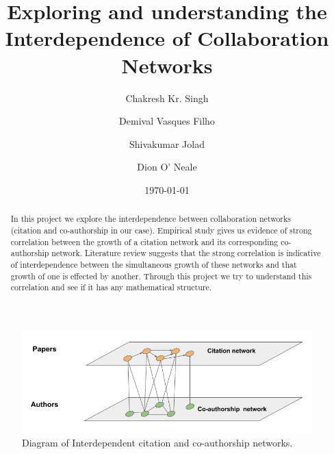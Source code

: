 \documentclass[aps, pre, twocolumn, nofootinbib]{revtex4-1}
\begin{document}

\title{Exploring and understanding the Interdependence of Collaboration Networks}

\author{Chakresh Kr. Singh}
\author{Demival Vasques Filho}
\author{Shivakumar Jolad}

\author{Dion O' Neale}


\date{\today}

\begin{abstract}
In this project we explore the interdependence between collaboration networks (citation and co-authorship in our case). Empirical study gives us evidence of strong correlation between the growth of a citation network and its corresponding co-authorship network. Literature review suggests that the strong correlation is indicative of interdependence between the simultaneous growth of these networks and that growth of one is effected by another. Through this project we try to understand this correlation and see if it has any mathematical structure.


\end{abstract}

\maketitle

\begin{figure}[htbp]
	\centering
	\includegraphics[scale = 0.5]{plots/schematic_of_networks}
	
	\captionsetup{singlelinecheck=false, justification=raggedright,  labelsep=space}
	\caption{Diagram of Interdependent citation and co-authorship networks.}
	\label{fi}
\end{figure}
\end{document}
